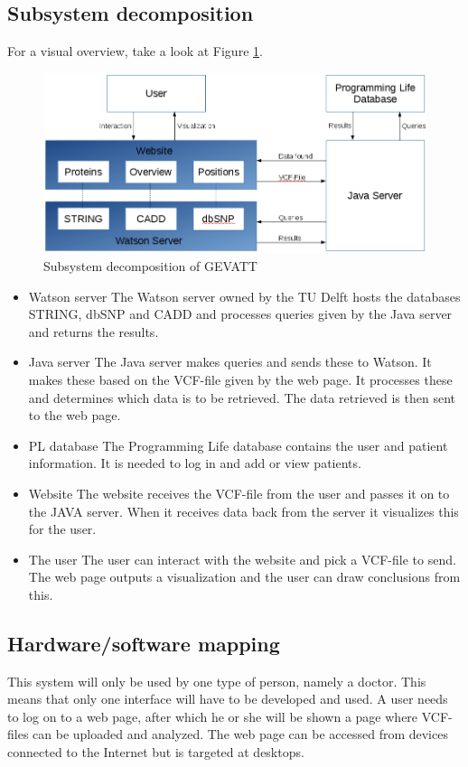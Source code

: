 	\subsection{Subsystem decomposition}
		For a visual overview, take a look at Figure \ref{fig:subsystemdecomp}.
		\begin{figure}
			\centering
			\includegraphics[scale=0.5]{schema1-improvedv2.png}
			\caption{Subsystem decomposition of GEVATT}
			\label{fig:subsystemdecomp}
		\end{figure}
		\begin{itemize}
			\item Watson server
				\subitem The Watson server owned by the TU Delft hosts the databases STRING\cite{franceschini2013string}, dbSNP\cite{sherry2001dbsnp} and CADD\cite{kircher2014general} and processes queries given by the Java server and returns the results.
			\item Java server
				\subitem The Java server makes queries and sends these to Watson. It makes these based on the VCF-file given by the web page. It processes these and determines which data is to be retrieved. The data retrieved is then sent to the web page.
			\item PL database
				\subitem The Programming Life database contains the user and patient information. It is needed to log in and add or view patients.
			\item Website
				\subitem The website receives the VCF-file from the user and passes it on to the JAVA server. When it receives data back from the server it visualizes this for the user.
			\item The user 
				\subitem The user can interact with the website and pick a VCF-file to send. The web page outputs a visualization and the user can draw conclusions from this.
		\end{itemize}
	\subsection{Hardware/software mapping}
		This system will only be used by one type of person, namely a doctor. This means that only one interface will have to be developed and used. A user needs to log on to a web page, after which he or she will be shown a page where VCF-files can be uploaded and analyzed. The web page can be accessed from devices connected to the Internet but is targeted at desktops.
